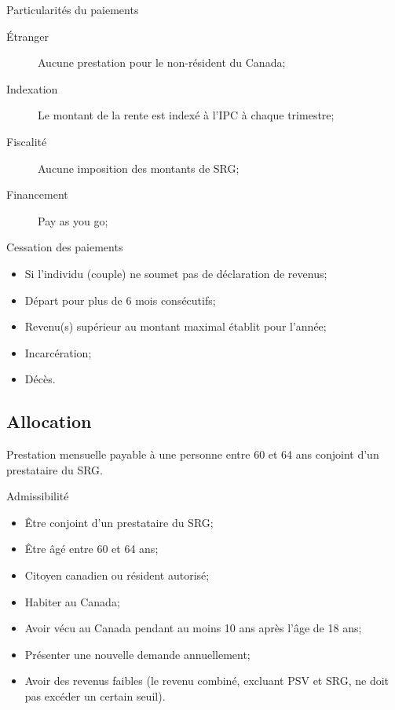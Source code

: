 \documentclass[10pt, french]{article}
\begin{document}
\begin{multicols*}{3}
\begin{conceptgen}{Particularités du paiements}
\begin{description}
	\item[Étranger]	Aucune prestation pour le non-résident du Canada;
	\item[Indexation]	Le montant de la rente est indexé à l'IPC à chaque trimestre;
	\item[Fiscalité]	Aucune imposition des montants de SRG;
	\item[Financement]	Pay as you go;
\end{description}
\end{conceptgen}

\begin{conceptgen}{Cessation des paiements}
\begin{itemize}[leftmargin = *]
	\item	Si l'individu (couple) ne soumet pas de déclaration de revenus;
	\item	Départ pour plus de 6 mois consécutifs;
	\item	Revenu(s) supérieur au montant maximal établit pour l'année;
	\item	Incarcération;
	\item	Décès.
\end{itemize}
\end{conceptgen}

\subsection{Allocation}
\begin{definitionNOHFILL}[Définition]
Prestation mensuelle payable à une personne entre 60 et 64 ans conjoint d'un prestataire du SRG.
\end{definitionNOHFILL}

\begin{conceptgen}{Admissibilité}
\begin{itemize}[leftmargin = *]
	\item	Être conjoint d'un prestataire du SRG;
	\item	Être âgé entre 60 et 64 ans;
	\item	Citoyen canadien ou résident autorisé;
	\item	Habiter au Canada;
	\item	Avoir vécu au Canada pendant au moins 10 ans après l'âge de 18 ans;
	\item	Présenter une nouvelle demande annuellement;
	\item	Avoir des revenus faibles (le revenu combiné, excluant PSV et SRG, ne doit pas excéder un certain seuil).
\end{itemize}
\end{conceptgen}


\end{multicols*}
\end{document}

